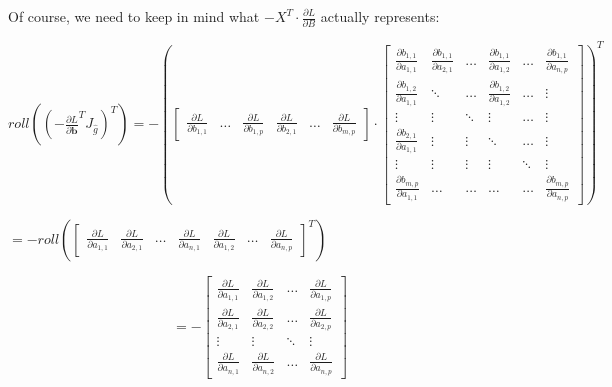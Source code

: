 \documentclass{article}
\begin{document}
Of course, we need to keep in mind what $-X^T \cdot \frac{\partial L}{\partial B}$ actually represents:
\begin{center}
    $roll((-\frac{\partial L}{\partial \mathbf{b}}^{T} J_{\widehat{g}})^T) =  -(\begin{bmatrix}
        \frac{\partial L}{\partial b_{1,1}} & \hdots &\frac{\partial L}{\partial b_{1,p}}& \frac{\partial L}{\partial b_{2,1}} & \hdots & \frac{\partial L}{\partial b_{m,p}}
    \end{bmatrix} \cdot \begin{bmatrix}
    \frac{\partial b_{1,1}}{\partial a_{1,1}} & \frac{\partial b_{1,1}}{\partial a_{2,1}} &\hdots &  \frac{\partial b_{1,1}}{\partial a_{1,2}} &\hdots & \frac{\partial b_{1,1}}{\partial a_{n,p}} \\
    \frac{\partial b_{1, 2}}{\partial a_{1,1}}  & \ddots &\hdots & \frac{\partial b_{1,2}}{\partial a_{1,2}}& \hdots& \vdots \\
    \vdots & \vdots & \ddots & \vdots & \hdots & \vdots\\
    \frac{\partial b_{2,1}}{\partial a_{1,1}} & \vdots & \vdots & \ddots & \hdots & \vdots\\
    \vdots & \vdots & \vdots & \vdots & \ddots & \vdots\\
    \frac{\partial b_{m,p}}{\partial a_{1,1}}  & \hdots & \hdots & \hdots & \hdots & \frac{\partial b_{m,p}}{\partial a_{n,p}}
\end{bmatrix})^T$
\end{center}
\begin{center}
$=-roll(\begin{bmatrix}
        \frac{\partial L}{\partial a_{1,1}} & \frac{\partial L}{\partial a_{2,1}} & \hdots & \frac{\partial L}{\partial a_{n,1}} & \frac{\partial L}{\partial a_{1,2}} & \hdots& \frac{\partial L}{\partial a_{n,p}}
    \end{bmatrix}^T)$
\end{center}
\begin{equation}
=-\begin{bmatrix}
        \frac{\partial L}{\partial a_{1,1}} & \frac{\partial L}{\partial a_{1,2}} & \hdots & \frac{\partial L}{\partial a_{1,p}} \\
        \frac{\partial L}{\partial a_{2,1}} & \frac{\partial L}{\partial a_{2,2}} & \hdots & \frac{\partial L}{\partial a_{2,p}} \\
        \vdots & \vdots & \ddots & \vdots\\
        \frac{\partial L}{\partial a_{n,1}} & \frac{\partial L}{\partial a_{n,2}} & \hdots & \frac{\partial L}{\partial a_{n,p}} 
    \end{bmatrix}
\end{equation}
\end{document}
